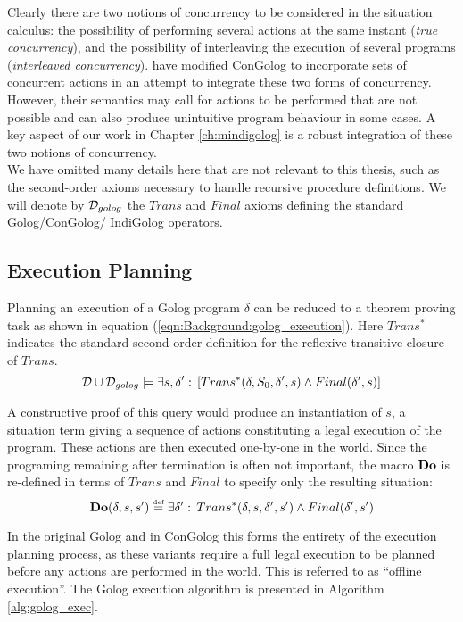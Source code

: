 Clearly there are two notions of concurrency to be considered in the
situation calculus: the possibility of performing several actions
at the same instant (\emph{true concurrency}), and the possibility
of interleaving the execution of several programs (\emph{interleaved
concurrency}). \citet{pinto99tcongolog} have modified ConGolog to
incorporate sets of concurrent actions in an attempt to integrate
these two forms of concurrency. However, their semantics may call
for actions to be performed that are not possible and can also produce
unintuitive program behaviour in some cases. A key aspect of our work
in Chapter \ref{ch:mindigolog} is a robust integration of these two
notions of concurrency.\\


We have omitted many details here that are not relevant to this thesis,
such as the second-order axioms necessary to handle recursive procedure
definitions. We will denote by $\mathcal{D}_{golog}$ the $Trans$ and $Final$
axioms defining the standard Golog/ConGolog/ IndiGolog operators.


\subsection{Execution Planning\label{sec:Background:Golog-Exec-Plannnig}}

Planning an execution of a Golog program $\delta$ can be reduced
to a theorem proving task as shown in equation (\ref{eqn:Background:golog_execution}).
Here $Trans^{*}$ indicates the standard second-order definition for
the reflexive transitive closure of $Trans$.\begin{equation}
\mathcal{D}\cup\mathcal{D}_{golog}\models\exists s,\delta':\,\left[Trans^{*}(\delta,S_{0},\delta',s)\wedge Final(\delta',s)\right]\label{eqn:Background:golog_execution}\end{equation}


A constructive proof of this query would produce an instantiation
of $s$, a situation term giving a sequence of actions constituting
a legal execution of the program. These actions are then executed
one-by-one in the world. Since the programing remaining after termination
is often not important, the macro $\mathbf{Do}$ is re-defined in terms of
$Trans$ and $Final$ to specify only the resulting situation:\[
\mathbf{Do}(\delta,s,s')\stackrel{\mbox{\tiny def}}{=}\exists\delta':\, Trans^{*}(\delta,s,\delta',s')\wedge Final(\delta',s')\]


In the original Golog and in ConGolog this forms the entirety of the
execution planning process, as these variants require a full legal
execution to be planned before any actions are performed in the world.
This is referred to as {}``offline execution''. The Golog execution
algorithm is presented in Algorithm \ref{alg:golog_exec}.

